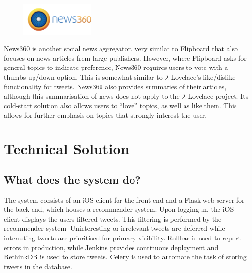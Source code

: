\documentclass{article}
\begin{document}
\begin{figure}[H]
    \includegraphics[width=0.33\textwidth,trim={1.2cm 1.3cm 0 0},clip]{news360_logo}
\end{figure}

\noindent News360 is another social news aggregator, very similar to Flipboard that also focuses on news articles from large publishers. However, where Flipboard asks for general topics to indicate preference,  News360 requires users to vote with a thumbs up/down option. This is somewhat similar to $\lambda$ Lovelace's like/dislike functionality for tweets. News360 also provides summaries of their articles, although this summarisation of news does not apply to the $\lambda$ Lovelace project. Its cold-start solution also allows users to “love” topics, as well as like them. This allows for further emphasis on topics that strongly interest the user.


\newpage


\section{Technical Solution} %

\subsection{What does the system do?} %
The system consists of an iOS client for the front-end and a Flask\cite{flask} web server for the back-end, which houses a recommender system. Upon logging in, the iOS client displays the users filtered tweets. This filtering is performed by the recommender system. Uninteresting or irrelevant tweets are deferred while interesting tweets are prioritised for primary visibility. Rollbar is used to report errors in production, while Jenkins provides continuous deployment and RethinkDB is used to store tweets. Celery is used to automate the task of storing tweets in the database.
\end{document}
